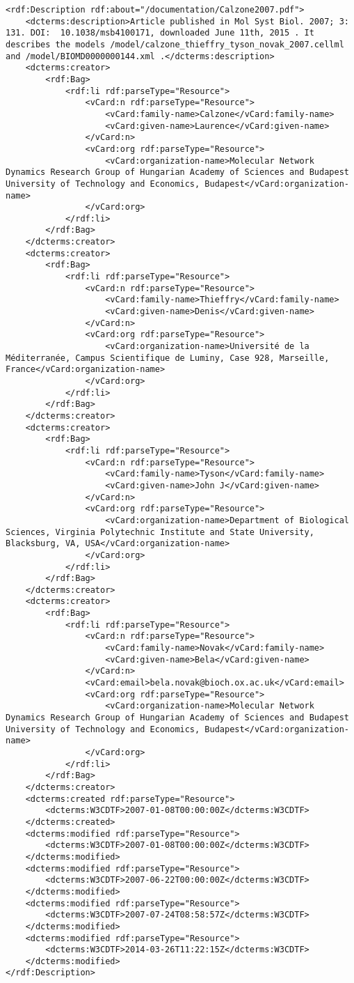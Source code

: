 \begin{mdframed}[style=mddefault,frametitle={Meta Data of the Publication \texttt{Calzone2007.pdf}}]
\begin{verbatim}
<rdf:Description rdf:about="/documentation/Calzone2007.pdf">
	<dcterms:description>Article published in Mol Syst Biol. 2007; 3: 131. DOI:  10.1038/msb4100171, downloaded June 11th, 2015 . It describes the models /model/calzone_thieffry_tyson_novak_2007.cellml and /model/BIOMD0000000144.xml .</dcterms:description>
	<dcterms:creator>
		<rdf:Bag>
			<rdf:li rdf:parseType="Resource">
				<vCard:n rdf:parseType="Resource">
					<vCard:family-name>Calzone</vCard:family-name>
					<vCard:given-name>Laurence</vCard:given-name>
				</vCard:n>
				<vCard:org rdf:parseType="Resource">
					<vCard:organization-name>Molecular Network Dynamics Research Group of Hungarian Academy of Sciences and Budapest University of Technology and Economics, Budapest</vCard:organization-name>
				</vCard:org>
			</rdf:li>
		</rdf:Bag>
	</dcterms:creator>
	<dcterms:creator>
		<rdf:Bag>
			<rdf:li rdf:parseType="Resource">
				<vCard:n rdf:parseType="Resource">
					<vCard:family-name>Thieffry</vCard:family-name>
					<vCard:given-name>Denis</vCard:given-name>
				</vCard:n>
				<vCard:org rdf:parseType="Resource">
					<vCard:organization-name>Université de la Méditerranée, Campus Scientifique de Luminy, Case 928, Marseille, France</vCard:organization-name>
				</vCard:org>
			</rdf:li>
		</rdf:Bag>
	</dcterms:creator>
	<dcterms:creator>
		<rdf:Bag>
			<rdf:li rdf:parseType="Resource">
				<vCard:n rdf:parseType="Resource">
					<vCard:family-name>Tyson</vCard:family-name>
					<vCard:given-name>John J</vCard:given-name>
				</vCard:n>
				<vCard:org rdf:parseType="Resource">
					<vCard:organization-name>Department of Biological Sciences, Virginia Polytechnic Institute and State University, Blacksburg, VA, USA</vCard:organization-name>
				</vCard:org>
			</rdf:li>
		</rdf:Bag>
	</dcterms:creator>
	<dcterms:creator>
		<rdf:Bag>
			<rdf:li rdf:parseType="Resource">
				<vCard:n rdf:parseType="Resource">
					<vCard:family-name>Novak</vCard:family-name>
					<vCard:given-name>Bela</vCard:given-name>
				</vCard:n>
				<vCard:email>bela.novak@bioch.ox.ac.uk</vCard:email>
				<vCard:org rdf:parseType="Resource">
					<vCard:organization-name>Molecular Network Dynamics Research Group of Hungarian Academy of Sciences and Budapest University of Technology and Economics, Budapest</vCard:organization-name>
				</vCard:org>
			</rdf:li>
		</rdf:Bag>
	</dcterms:creator>
	<dcterms:created rdf:parseType="Resource">
		<dcterms:W3CDTF>2007-01-08T00:00:00Z</dcterms:W3CDTF>
	</dcterms:created>
	<dcterms:modified rdf:parseType="Resource">
		<dcterms:W3CDTF>2007-01-08T00:00:00Z</dcterms:W3CDTF>
	</dcterms:modified>
	<dcterms:modified rdf:parseType="Resource">
		<dcterms:W3CDTF>2007-06-22T00:00:00Z</dcterms:W3CDTF>
	</dcterms:modified>
	<dcterms:modified rdf:parseType="Resource">
		<dcterms:W3CDTF>2007-07-24T08:58:57Z</dcterms:W3CDTF>
	</dcterms:modified>
	<dcterms:modified rdf:parseType="Resource">
		<dcterms:W3CDTF>2014-03-26T11:22:15Z</dcterms:W3CDTF>
	</dcterms:modified>
</rdf:Description>
\end{verbatim}
\end{mdframed}
